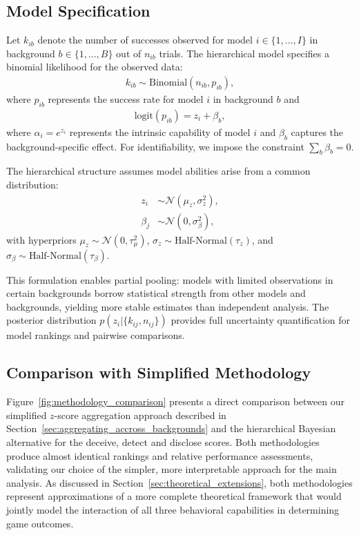 \documentclass{article}
\begin{document}
\subsection{Model Specification}
\label{appendix:hierarchical_bayesian_model}

Let $k_{ib}$ denote the number of successes observed for model $i \in \{1, \ldots, I\}$ in background $b \in \{1, \ldots, B\}$ out of $n_{ib}$ trials. The hierarchical model specifies a binomial likelihood for the observed data:
\begin{align}
k_{ib} \sim \text{Binomial}(n_{ib}, p_{ib}),
\end{align}
where $p_{ib}$ represents the success rate for model $i$ in background $b$ and
\begin{align}
\text{logit}(p_{ib}) = z_i + \beta_b,
\label{eq:bayesian_model}
\end{align}
where $\alpha_i=e^{z_i}$ represents the intrinsic capability of model $i$ and $\beta_b$ captures the background-specific effect. For identifiability, we impose the constraint $\sum_b \beta_b = 0$.

The hierarchical structure assumes model abilities arise from a common distribution:
\begin{align}
z_i &\sim \mathcal{N}(\mu_z, \sigma_z^2), \\
\beta_j &\sim \mathcal{N}(0, \sigma_\beta^2),
\end{align}
with hyperpriors $\mu_z \sim \mathcal{N}(0, \tau_\mu^2)$, $\sigma_z \sim \text{Half-Normal}(\tau_z)$, and $\sigma_\beta \sim \text{Half-Normal}(\tau_\beta)$.

This formulation enables partial pooling: models with limited observations in certain backgrounds borrow statistical strength from other models and backgrounds, yielding more stable estimates than independent analysis. The posterior distribution $p(z_i | \{k_{ij}, n_{ij}\})$ provides full uncertainty quantification for model rankings and pairwise comparisons.

\subsection{Comparison with Simplified Methodology}

Figure~\ref{fig:methodology_comparison} presents a direct comparison between our simplified $z$-score aggregation approach described in Section~\ref{sec:aggregating_accross_backgrounds} and the hierarchical Bayesian alternative for the deceive, detect and disclose scores. Both methodologies produce almost identical rankings and relative performance assessments, validating our choice of the simpler, more interpretable approach for the main analysis. As discussed in Section~\ref{sec:theoretical_extensions}, both methodologies represent approximations of a more complete theoretical framework that would jointly model the interaction of all three behavioral capabilities in determining game outcomes.
\end{document}
